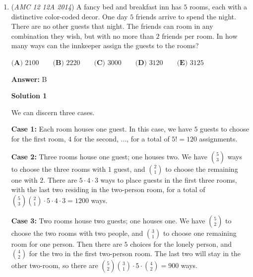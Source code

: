\begin{enumerate}
 Let the radius of the larger and smaller circles be $R$ and $r$, respectively. Pretend line $AB$ is equal to the arc length of both circles, then 
 \[\frac{30^{\circ}}{360^{\circ}}\cdot 2\pi R=\frac{60^{\circ}}{360^{\circ}}\cdot 2\pi r\]
 \[R=2r\] and the answer to the problem is 
 \[\frac{\pi R^2}{\pi r^2} = 4\]But, this is only an estimate, the correct answer is not 4, but instead \textit{about} 4. We can asume that the closest other answer choice to 4 is correct: 
 \[\boxed{\textbf{(D) }2+\sqrt3}\]

 (Solution by FlareVa)

 


	\item (\textit{AMC 12 12A 2014}) A fancy bed and breakfast inn has $5$ rooms, each with a distinctive color-coded decor.  One day $5$ friends arrive to spend the night.  There are no other guests that night.  The friends can room in any combination they wish, but with no more than $2$ friends per room.  In how many ways can the innkeeper assign the guests to the rooms?


 $\textbf{(A) }2100\qquad \textbf{(B) }2220\qquad \textbf{(C) }3000\qquad \textbf{(D) }3120\qquad \textbf{(E) }3125\qquad$

 \textbf{Answer: }B



\textbf{Solution 1}

We can discern three cases.

 \textbf{Case 1:} Each room houses one guest. In this case, we have $5$ guests to choose for the first room, $4$ for the second, ..., for a total of $5!=120$ assignments.

 \textbf{Case 2:} Three rooms house one guest; one houses two. We have $\binom{5}{3}$ ways to choose the three rooms with $1$ guest, and $\binom{2}{1}$ to choose the remaining one with $2$. There are $5\cdot4\cdot3$ ways to place guests in the first three rooms, with the last two residing in the two-person room, for a total of $\binom{5}{3}\binom{2}{1}\cdot5\cdot4\cdot3=1200$ ways.

 \textbf{Case 3:} Two rooms house two guests; one houses one. We have $\binom{5}{2}$ to choose the two rooms with two people, and $\binom{3}{1}$ to choose one remaining room for one person. Then there are $5$ choices for the lonely person, and $\binom{4}{2}$ for the two in the first two-person room. The last two will stay in the other two-room, so there are $\binom{5}{2}\binom{3}{1}\cdot5\cdot\binom{4}{2}=900$ ways.


\end{enumerate}
